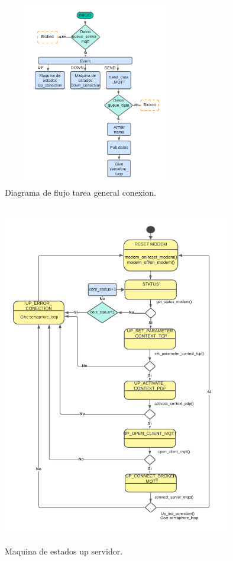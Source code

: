\begin{figure}[htbp]
  \centering
	\includegraphics[width=8cm, height=8cm]{./Figures/DF general task conection.png}
	\caption{Diagrama de flujo tarea general conexion.}
	\label{fig:Df tarea conexion}
\end{figure}

\begin{figure}[htbp]
  \centering
	\includegraphics[width=10cm, height=15cm]{./Figures/SM up server.png}
	\caption{Maquina de estados up servidor.}
	\label{fig:Maquina de estados up servidor}
\end{figure}

